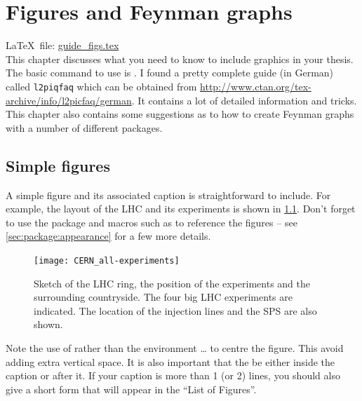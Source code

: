 
\chapter{Figures and Feynman graphs}%
\label{sec:fig}

\LaTeX\ file: \href{run:./guide_figs.tex}{guide\_figs.tex}\\[1ex]
\noindent
This chapter discusses what you need to know to include graphics in
your thesis. The basic command to use is .
I found a pretty complete guide (in German) called \texttt{l2piqfaq}
which can be obtained from
\url{http://www.ctan.org/tex-archive/info/l2picfaq/german}. It contains
a lot of detailed information and tricks.
This chapter also contains some suggestions as to how to create Feynman
graphs with a number of different packages.


\section{Simple figures}%
\label{sec:fig:simple}

A simple figure and its associated caption is straightforward to include.
For example, the layout of the LHC and its experiments is
shown in \cref{fig:LHC}.
Don't forget to use the package  and macros such as 
to reference the figures -- see \cref{sec:package:appearance} for a few more details.

\begin{figure}[htbp]
\begin{tcblisting}{}
\centering
\texttt{[image: CERN\_all-experiments]}
\caption[Sketch of the LHC ring, the position of the experiments and
  the surrounding countryside.]{Sketch of the LHC ring, the position
  of the experiments and the surrounding countryside. The four big
  LHC experiments are indicated. The location of the injection lines
  and the SPS are also shown.}%
\label{fig:LHC}
\end{tcblisting}
\end{figure}

Note the use of  rather than the environment
 \ldots {} to centre the figure. This
avoid adding extra vertical space. It is also important that the
 be either inside the caption or after it. If your
caption is more than 1 (or 2) lines, you should also give a short form
that will appear in the ``List of Figures''.

